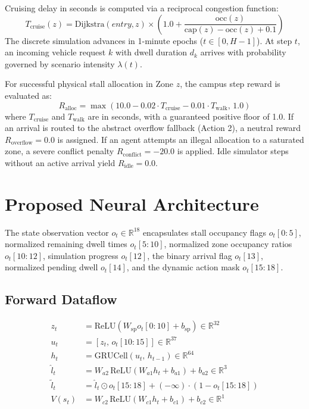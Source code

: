 \documentclass[journal]{IEEEtran}
\begin{document}
Cruising delay in seconds is computed via a reciprocal congestion function:
\begin{equation}
T_{\text{cruise}}(z) = \text{Dijkstra}(entry, z) \times \left(1.0 + \frac{\text{occ}(z)}{\text{cap}(z) - \text{occ}(z) + 0.1}\right)
\end{equation}
The discrete simulation advances in 1-minute epochs ($t \in [0, H-1]$). At step $t$, an incoming vehicle request $k$ with dwell duration $d_k$ arrives with probability governed by scenario intensity $\lambda(t)$.

For successful physical stall allocation in Zone $z$, the campus step reward is evaluated as:
\begin{equation}
R_{\text{alloc}} = \max\left(10.0 - 0.02 \cdot T_{\text{cruise}} - 0.01 \cdot T_{\text{walk}}, \, 1.0\right)
\end{equation}
where $T_{\text{cruise}}$ and $T_{\text{walk}}$ are in seconds, with a guaranteed positive floor of 1.0. If an arrival is routed to the abstract overflow fallback (Action 2), a neutral reward $R_{\text{overflow}} = 0.0$ is assigned. If an agent attempts an illegal allocation to a saturated zone, a severe conflict penalty $R_{\text{conflict}} = -20.0$ is applied. Idle simulator steps without an active arrival yield $R_{\text{idle}} = 0.0$.

\section{Proposed Neural Architecture}
The state observation vector $o_t \in \mathbb{R}^{18}$ encapsulates stall occupancy flags $o_t[0:5]$, normalized remaining dwell times $o_t[5:10]$, normalized zone occupancy ratios $o_t[10:12]$, simulation progress $o_t[12]$, the binary arrival flag $o_t[13]$, normalized pending dwell $o_t[14]$, and the dynamic action mask $o_t[15:18]$.

\subsection{Forward Dataflow}
\begin{align}
z_t &= \text{ReLU}\left(W_{\text{sp}} o_t[0:10] + b_{\text{sp}}\right) \in \mathbb{R}^{32} \\
u_t &= [z_t, \, o_t[10:15]] \in \mathbb{R}^{37} \\
h_t &= \text{GRUCell}(u_t, \, h_{t-1}) \in \mathbb{R}^{64} \\
\hat{l}_t &= W_{a2} \, \text{ReLU}(W_{a1} h_t + b_{a1}) + b_{a2} \in \mathbb{R}^3 \\
\tilde{l}_t &= \hat{l}_t \odot o_t[15:18] + (-\infty) \cdot (1 - o_t[15:18]) \\
V(s_t) &= W_{c2} \, \text{ReLU}(W_{c1} h_t + b_{c1}) + b_{c2} \in \mathbb{R}^1
\end{align}
\end{document}
